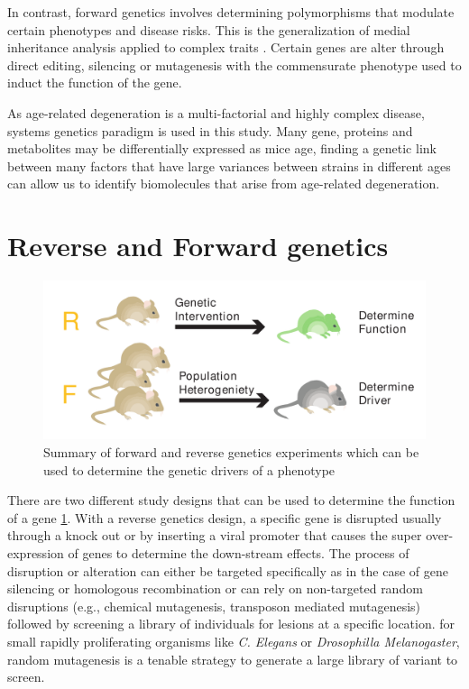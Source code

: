 \documentclass[a4paper]{book}
\begin{document}
	In contrast, forward genetics involves determining polymorphisms that modulate certain phenotypes and disease risks. This is the generalization of medial inheritance analysis applied to complex traits \citep{Williams2015TheAnalysis}. Certain genes are alter through direct editing, silencing or mutagenesis with the commensurate phenotype used to induct the function of the gene. 
	
	As age-related degeneration is a multi-factorial and highly complex disease, systems genetics paradigm is used in this study. Many gene, proteins and metabolites may be differentially expressed as mice age, finding a genetic link between many factors that have large variances between strains in different ages can allow us to identify biomolecules that arise from age-related degeneration.
		
	\section{Reverse and Forward genetics}
	
	\begin{figure}[ht]
		\centering
		\includegraphics[width=.7\linewidth]{1.Introduction_Figures/Forward_Genetics.pdf}
		\caption{Summary of forward and reverse genetics experiments which can be used to determine the genetic drivers of a phenotype}
		\label{fig:Forward and Reverse Genetics}
	\end{figure}
	
	There are two different study designs that can be used to determine the function of a gene \ref{fig:Forward and Reverse Genetics}. With a reverse genetics design, a specific gene is disrupted usually through a knock out or by inserting a viral promoter that causes the super over-expression of genes to determine the down-stream effects. The process of disruption or alteration can either be targeted specifically as in the case of gene silencing or homologous recombination or can rely on non-targeted random disruptions (e.g., chemical mutagenesis, transposon mediated mutagenesis) followed by screening a library of individuals for lesions at a specific location. for small rapidly proliferating organisms like \textit{C. Elegans} or \textit{Drosophilla Melanogaster}, random mutagenesis is a tenable strategy to generate a large library of variant to screen. 
\end{document}
